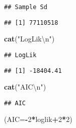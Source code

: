 \documentclass[]{article}
\newenvironment{Shaded}{\begin{snugshade}}{\end{snugshade}}
\newcommand{\KeywordTok}[1]{\textcolor[rgb]{0.13,0.29,0.53}{\textbf{#1}}}
\newcommand{\DataTypeTok}[1]{\textcolor[rgb]{0.13,0.29,0.53}{#1}}
\newcommand{\DecValTok}[1]{\textcolor[rgb]{0.00,0.00,0.81}{#1}}
\newcommand{\CharTok}[1]{\textcolor[rgb]{0.31,0.60,0.02}{#1}}
\newcommand{\StringTok}[1]{\textcolor[rgb]{0.31,0.60,0.02}{#1}}
\newcommand{\OperatorTok}[1]{\textcolor[rgb]{0.81,0.36,0.00}{\textbf{#1}}}
\newcommand{\NormalTok}[1]{#1}
\begin{document}
\begin{verbatim}
## Sample Sd
\end{verbatim}

\begin{Shaded}
\end{Shaded}

\begin{verbatim}
## [1] 77110518
\end{verbatim}

\begin{Shaded}
\begin{Highlighting}[]
\KeywordTok{cat}\NormalTok{(}\StringTok{"LogLik}\CharTok{\textbackslash{}n}\StringTok{"}\NormalTok{)}
\end{Highlighting}
\end{Shaded}

\begin{verbatim}
## LogLik
\end{verbatim}

\begin{Shaded}
\end{Shaded}

\begin{verbatim}
## [1] -18404.41
\end{verbatim}

\begin{Shaded}
\begin{Highlighting}[]
\KeywordTok{cat}\NormalTok{(}\StringTok{"AIC}\CharTok{\textbackslash{}n}\StringTok{"}\NormalTok{)}
\end{Highlighting}
\end{Shaded}

\begin{verbatim}
## AIC
\end{verbatim}

\begin{Shaded}
\begin{Highlighting}[]
\NormalTok{(}\DataTypeTok{AIC=}\OperatorTok{-}\DecValTok{2}\OperatorTok{*}\NormalTok{loglik}\OperatorTok{+}\DecValTok{2}\OperatorTok{*}\DecValTok{2}\NormalTok{)}
\end{Highlighting}
\end{Shaded}
\end{document}
